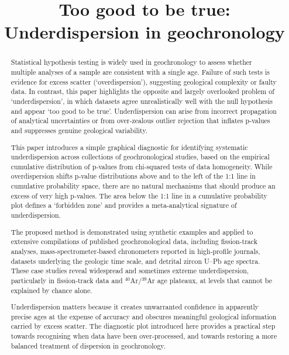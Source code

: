 \documentclass{article}
\title{Too good to be true: Underdispersion in geochronology}
\author{}
\date{}
\begin{document}
\maketitle
\vspace{-3em}

\begin{abstract}
Statistical hypothesis testing is widely used in geochronology to
assess whether multiple analyses of a sample are consistent with a
single age. Failure of such tests is evidence for excess scatter
(`overdispersion'), suggesting geological complexity or faulty
data. In contrast, this paper highlights the opposite and largely
overlooked problem of `underdispersion', in which datasets agree
unrealistically well with the null hypothesis and appear `too good to
be true'. Underdispersion can arise from incorrect propagation of
analytical uncertainties or from over‑zealous outlier rejection that
inflates p‑values and suppresses genuine geological
variability.\medskip

This paper introduces a simple graphical diagnostic for identifying
systematic underdispersion across collections of geochronological
studies, based on the empirical cumulative distribution of p‑values
from chi‑squared tests of data homogeneity. While overdispersion
shifts p‑value distributions above and to the left of the 1:1 line in
cumulative probability space, there are no natural mechanisms that
should produce an excess of very high p‑values.  The area below the
1:1 line in a cumulative probability plot defines a `forbidden zone'
and provides a meta-analytical signature of underdispersion.\medskip

The proposed method is demonstrated using synthetic examples and
applied to extensive compilations of published geochronological data,
including fission‑track analyses, mass‑spectrometer‑based chronometers
reported in high‑profile journals, datasets underlying the geologic
time scale, and detrital zircon U--Pb age spectra.  These case studies
reveal widespread and sometimes extreme underdispersion, particularly
in fission‑track data and $^{40}$Ar/$^{39}$Ar age plateaux, at levels that
cannot be explained by chance alone.\medskip

Underdispersion matters because it creates unwarranted confidence in
apparently precise ages at the expense of accuracy and obscures
meaningful geological information carried by excess scatter.  The
diagnostic plot introduced here provides a practical step towards
recognising when data have been over‑processed, and towards restoring
a more balanced treatment of dispersion in geochronology.
\end{abstract}
\end{document}
